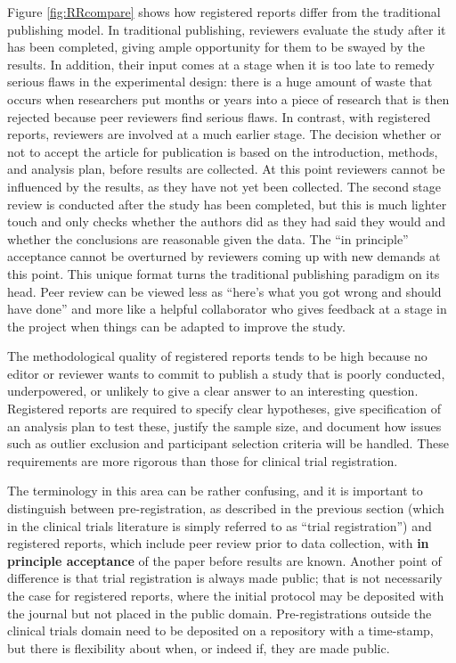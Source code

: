 \documentclass{krantz}
\begin{document}
Figure \ref{fig:RRcompare} shows how registered reports differ from the traditional publishing model. In traditional publishing, reviewers evaluate the study after it has been completed, giving ample opportunity for them to be swayed by the results. In addition, their input comes at a stage when it is too late to remedy serious flaws in the experimental design: there is a huge amount of waste that occurs when researchers put months or years into a piece of research that is then rejected because peer reviewers find serious flaws. In contrast, with registered reports, reviewers are involved at a much earlier stage. The decision whether or not to accept the article for publication is based on the introduction, methods, and analysis plan, before results are collected. At this point reviewers cannot be influenced by the results, as they have not yet been collected. The second stage review is conducted after the study has been completed, but this is much lighter touch and only checks whether the authors did as they had said they would and whether the conclusions are reasonable given the data. The ``in principle'' acceptance cannot be overturned by reviewers coming up with new demands at this point. This unique format turns the traditional publishing paradigm on its head. Peer review can be viewed less as ``here's what you got wrong and should have done'' and more like a helpful collaborator who gives feedback at a stage in the project when things can be adapted to improve the study.

The methodological quality of registered reports tends to be high because no editor or reviewer wants to commit to publish a study that is poorly conducted, underpowered, or unlikely to give a clear answer to an interesting question. Registered reports are required to specify clear hypotheses, give specification of an analysis plan to test these, justify the sample size, and document how issues such as outlier exclusion and participant selection criteria will be handled. These requirements are more rigorous than those for clinical trial registration.

The terminology in this area can be rather confusing, and it is important to distinguish between pre-registration, as described in the previous section (which in the clinical trials literature is simply referred to as ``trial registration'') and registered reports, which include peer review prior to data collection, with \textbf{in principle acceptance} of the paper before results are known. Another point of difference is that trial registration is always made public; that is not necessarily the case for registered reports, where the initial protocol may be deposited with the journal but not placed in the public domain. Pre-registrations outside the clinical trials domain need to be deposited on a repository with a time-stamp, but there is flexibility about when, or indeed if, they are made public.
\end{document}
